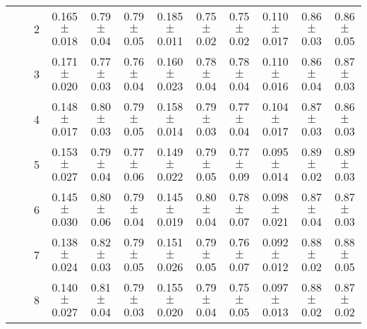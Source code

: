 \begin{table*}
{\begin{tabular}{|l|c|c||c|c|c||c|c|c||c|c|c|}
 & & 2 & \textcolor{gate_color}{0.165$\pm$0.018} & \textcolor{gate_color}{0.79$\pm$0.04} & \textcolor{gate_color}{0.79$\pm$0.05} & \textcolor{mixed_color}{0.185$\pm$0.011} & \textcolor{mixed_color}{0.75$\pm$0.02} & \textcolor{mixed_color}{0.75$\pm$0.02} & \textcolor{pulsed_color}{0.110$\pm$0.017} & \textcolor{pulsed_color}{0.86$\pm$0.03} & \textcolor{pulsed_color}{0.86$\pm$0.05} \\
 & & 3 & \textcolor{gate_color}{0.171$\pm$0.020} & \textcolor{gate_color}{0.77$\pm$0.03} & \textcolor{gate_color}{0.76$\pm$0.04} & \textcolor{mixed_color}{0.160$\pm$0.023} & \textcolor{mixed_color}{0.78$\pm$0.04} & \textcolor{mixed_color}{0.78$\pm$0.04} & \textcolor{pulsed_color}{0.110$\pm$0.016} & \textcolor{pulsed_color}{0.86$\pm$0.04} & \textcolor{pulsed_color}{0.87$\pm$0.03} \\
 & & 4 & \textcolor{gate_color}{0.148$\pm$0.017} & \textcolor{gate_color}{0.80$\pm$0.03} & \textcolor{gate_color}{0.79$\pm$0.05} & \textcolor{mixed_color}{0.158$\pm$0.014} & \textcolor{mixed_color}{0.79$\pm$0.03} & \textcolor{mixed_color}{0.77$\pm$0.04} & \textcolor{pulsed_color}{0.104$\pm$0.017} & \textcolor{pulsed_color}{0.87$\pm$0.03} & \textcolor{pulsed_color}{0.86$\pm$0.03} \\
 & & 5 & \textcolor{gate_color}{0.153$\pm$0.027} & \textcolor{gate_color}{0.79$\pm$0.04} & \textcolor{gate_color}{0.77$\pm$0.06} & \textcolor{mixed_color}{0.149$\pm$0.022} & \textcolor{mixed_color}{0.79$\pm$0.05} & \textcolor{mixed_color}{0.77$\pm$0.09} & \textcolor{pulsed_color}{0.095$\pm$0.014} & \textcolor{pulsed_color}{0.89$\pm$0.02} & \textcolor{pulsed_color}{0.89$\pm$0.03} \\
 & & 6 & \textcolor{gate_color}{0.145$\pm$0.030} & \textcolor{gate_color}{0.80$\pm$0.06} & \textcolor{gate_color}{0.79$\pm$0.04} & \textcolor{mixed_color}{0.145$\pm$0.019} & \textcolor{mixed_color}{0.80$\pm$0.04} & \textcolor{mixed_color}{0.78$\pm$0.07} & \textcolor{pulsed_color}{0.098$\pm$0.021} & \textcolor{pulsed_color}{0.87$\pm$0.04} & \textcolor{pulsed_color}{0.87$\pm$0.03} \\
 & & 7 & \textcolor{gate_color}{0.138$\pm$0.024} & \textcolor{gate_color}{0.82$\pm$0.03} & \textcolor{gate_color}{0.79$\pm$0.05} & \textcolor{mixed_color}{0.151$\pm$0.026} & \textcolor{mixed_color}{0.79$\pm$0.05} & \textcolor{mixed_color}{0.76$\pm$0.07} & \textcolor{pulsed_color}{0.092$\pm$0.012} & \textcolor{pulsed_color}{0.88$\pm$0.02} & \textcolor{pulsed_color}{0.88$\pm$0.05} \\
 & & 8 & \textcolor{gate_color}{0.140$\pm$0.027} & \textcolor{gate_color}{0.81$\pm$0.04} & \textcolor{gate_color}{0.79$\pm$0.03} & \textcolor{mixed_color}{0.155$\pm$0.020} & \textcolor{mixed_color}{0.79$\pm$0.04} & \textcolor{mixed_color}{0.75$\pm$0.05} & \textcolor{pulsed_color}{0.097$\pm$0.013} & \textcolor{pulsed_color}{0.88$\pm$0.02} & \textcolor{pulsed_color}{0.87$\pm$0.02} \\

\end{tabular}}
\end{table*}
